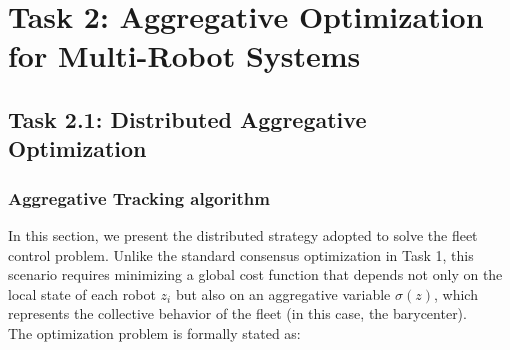 \documentclass[a4paper,11pt,oneside]{book}
\begin{document}
\chapter{Task 2: Aggregative Optimization for Multi-Robot Systems}
\label{chapter2}



\section{Task 2.1: Distributed Aggregative Optimization}


\subsection{Aggregative Tracking algorithm}

In this section, we present the distributed strategy adopted to solve the fleet control problem. Unlike the standard consensus optimization in Task 1, this scenario requires minimizing a global cost function that depends not only on the local state of each robot $z_i$ but also on an aggregative variable $\sigma(z)$, which represents the collective behavior of the fleet (in this case, the barycenter).
\\
The optimization problem is formally stated as:
\end{document}
